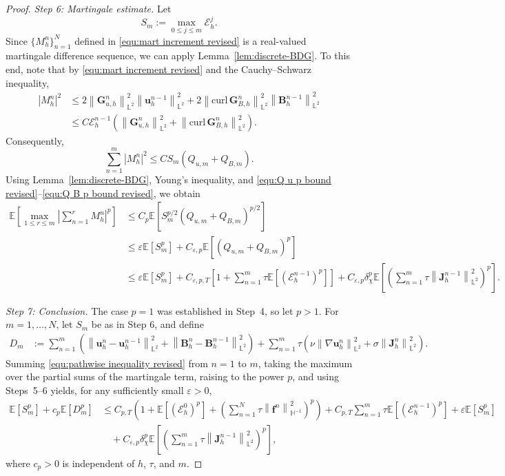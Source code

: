 \documentclass[11pt, reqno]{amsart}
\theoremstyle{definition}
\numberwithin{equation}{section}
\newcommand{\curl}{\mathrm{curl}\,}
\newcommand{\bff}{\boldsymbol}
\newcommand{\bb}{\mathbb}
\newcommand{\norm}[2]{\left\|{#1}\right\|_{#2}}
\newcommand{\abs}[1]{\left|{#1}\right|}
\begin{document}
\begin{proof}
	
	\emph{Step 6: Martingale estimate.}
	Let
	\[
	S_m:=\max_{0\le j\le m}\mathcal E_h^j.
	\]
	Since $\{M_h^n\}_{n=1}^{N}$ defined in
	\eqref{equ:mart increment revised} is a real-valued martingale difference
	sequence, we can apply Lemma~\ref{lem:discrete-BDG}. To this end, note that by \eqref{equ:mart increment revised} and the Cauchy--Schwarz inequality,
	\begin{align*}
		\abs{M_h^n}^2
		&\le
		2\norm{\bff G_{u,h}^n}{\bb L^2}^2
		\norm{\bff u_h^{n-1}}{\bb L^2}^2
		+
		2\norm{\curl\bff G_{B,h}^n}{\bb L^2}^2
		\norm{\bff B_h^{n-1}}{\bb L^2}^2
		\\
		&\le
		C\mathcal E_h^{n-1}
		\left(
		\norm{\bff G_{u,h}^n}{\bb L^2}^2
		+
		\norm{\curl\bff G_{B,h}^n}{\bb L^2}^2
		\right).
	\end{align*}
	Consequently,
	\[
	\sum_{n=1}^{m}\abs{M_h^n}^2
	\le
	CS_m\left(Q_{u,m}+Q_{B,m}\right).
	\]
	Using Lemma~\ref{lem:discrete-BDG}, Young's inequality, and
	\eqref{equ:Q u p bound revised}--\eqref{equ:Q B p bound revised}, we obtain
	\begin{align*}
		\bb E\left[
		\max_{1\le r\le m}
		\abs{\sum_{n=1}^{r}M_h^n}^{p}
		\right]
		&\le
		C_p\bb E\left[
		S_m^{p/2}
		\left(Q_{u,m}+Q_{B,m}\right)^{p/2}
		\right]
		\nonumber\\
		&\le
		\varepsilon\bb E[S_m^p]
		+
		C_{\varepsilon,p}
		\bb E\left[
		\left(Q_{u,m}+Q_{B,m}\right)^p
		\right]
		\nonumber\\
		&\le
		\varepsilon\bb E[S_m^p]
		+
		C_{\varepsilon,p,T}
		\left[
		1+
		\sum_{n=1}^{m}\tau
		\bb E\left[(\mathcal E_h^{n-1})^p\right]
		\right]
		+
		C_{\varepsilon,p}\delta_\chi^p
		\bb E\left[
		\left(
		\sum_{n=1}^{m}\tau
		\norm{\bff J_h^{n-1}}{\bb L^2}^2
		\right)^p
		\right].
	\end{align*}
	
	
	\emph{Step 7: Conclusion.}
	The case $p=1$ was established in Step~4, so let $p>1$. For
	$m=1,\ldots,N$, let $S_m$ be as in Step 6, and define
	\begin{align*}
		D_m &:=
		\sum_{n=1}^{m}
		\left(
		\norm{\bff u_h^n-\bff u_h^{n-1}}{\bb L^2}^2
		+
		\norm{\bff B_h^n-\bff B_h^{n-1}}{\bb L^2}^2
		\right)
		+
		\sum_{n=1}^{m}\tau
		\left(
		\nu\norm{\nabla\bff u_h^n}{\bb L^2}^2
		+
		\sigma\norm{\bff J_h^n}{\bb L^2}^2
		\right).
	\end{align*}
	Summing \eqref{equ:pathwise inequality revised} from $n=1$ to $m$,
	taking the maximum over the partial sums of the martingale term, raising
	to the power $p$, and using Steps~5--6 yields, for any sufficiently small
	$\varepsilon>0$,
	\begin{align}
		\label{equ:stability conclusion before absorption}
		\bb E[S_m^p]
		+
		c_p\bb E[D_m^p]
		&\le
		C_{p,T}
		\left(
		1
		+
		\bb E[(\mathcal E_h^0)^p]
		+
		\left(
		\sum_{n=1}^{N}
		\tau\norm{\bff f^n}{\bb H^{-1}}^2
		\right)^p
		\right)
		+
		C_{p,T}
		\sum_{n=1}^{m}
		\tau\bb E[(\mathcal E_h^{n-1})^p]
		+
		\varepsilon\bb E[S_m^p]
		\nonumber\\
		&\quad
		+
		C_{\varepsilon,p}\delta_\chi^p
		\bb E\left[
		\left(
		\sum_{n=1}^{m}
		\tau\norm{\bff J_h^{n-1}}{\bb L^2}^2
		\right)^p
		\right],
	\end{align}
	where $c_p>0$ is independent of $h$, $\tau$, and $m$.
	

\end{proof}
\end{document}
